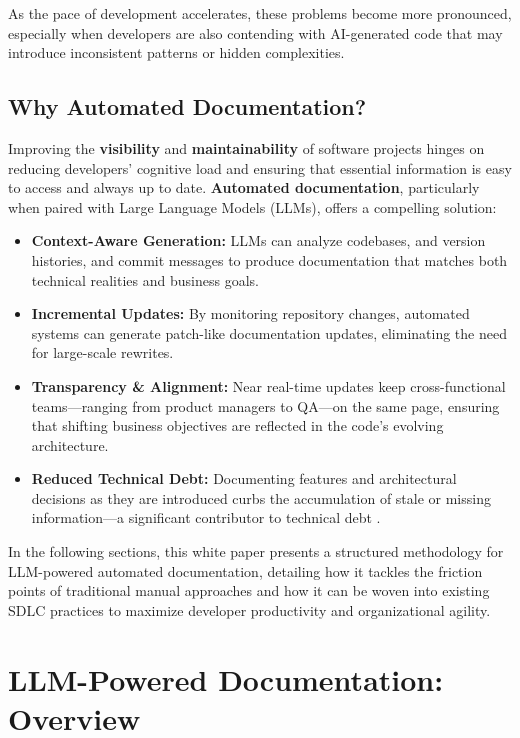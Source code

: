 \documentclass[12pt,oneside]{article}
\begin{document}
As the pace of development accelerates, these problems become more pronounced, especially when developers are also 
contending with AI-generated code that may introduce inconsistent patterns or hidden complexities.

\subsection{Why Automated Documentation?}

Improving the \textbf{visibility} and \textbf{maintainability} of software projects hinges on reducing developers’ 
cognitive load and ensuring that essential information is easy to access and always up to date. 
\textbf{Automated documentation}, particularly when paired with Large Language Models (LLMs), offers a compelling 
solution:

\begin{itemize}
    \item \textbf{Context-Aware Generation:} LLMs can analyze codebases, and version histories, and commit messages to produce documentation that matches both technical realities and business goals.
    \item \textbf{Incremental Updates:} By monitoring repository changes, automated systems can generate patch-like documentation updates, eliminating the need for large-scale rewrites.
    \item \textbf{Transparency \& Alignment:} Near real-time updates keep cross-functional teams—ranging from product managers to QA—on the same page, ensuring that shifting business objectives are reflected in the code’s evolving architecture.
    \item \textbf{Reduced Technical Debt:} Documenting features and architectural decisions as they are introduced curbs the accumulation of stale or missing information—a significant contributor to technical debt \textcite{pandi2023}.
\end{itemize}

In the following sections, this white paper presents a structured methodology for LLM-powered automated documentation, 
detailing how it tackles the friction points of traditional manual approaches and how it can be woven into existing 
SDLC practices to maximize developer productivity and organizational agility.

\section{LLM-Powered Documentation: Overview}
\end{document}
